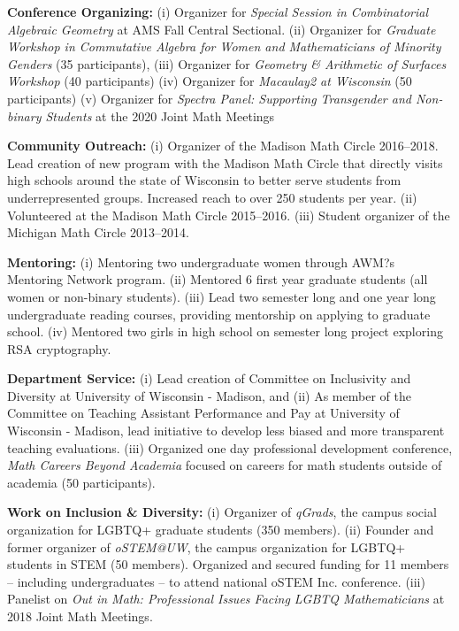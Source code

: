 \documentclass[11pt]{article}
\begin{document}
\begin{bibenum}[itemsep=4pt]

    \item \textbf{Conference Organizing:}
        (i) Organizer for \textit{Special Session in Combinatorial Algebraic Geometry} at AMS Fall Central Sectional. 
        (ii) Organizer for \textit{Graduate Workshop in Commutative Algebra for Women and Mathematicians of Minority Genders} (35 participants), 
        (iii) Organizer for \textit{Geometry \& Arithmetic of Surfaces Workshop} (40 participants)
        (iv) Organizer for \textit{Macaulay2 at Wisconsin} (50 participants)
        (v) Organizer for \textit{Spectra Panel: Supporting Transgender and Non-binary Students} at the 2020 Joint Math Meetings
    

    \item \textbf{Community Outreach:}
    	(i) Organizer of the Madison Math Circle 2016--2018. Lead creation of new program with the Madison Math Circle that directly visits high schools around the state of Wisconsin to better serve students from underrepresented groups. Increased reach to over 250 students per year.
	(ii)  Volunteered at the Madison Math Circle 2015--2016.
	(iii) Student organizer of the Michigan Math Circle 2013--2014.

    \item \textbf{Mentoring:}
        (i) Mentoring two undergraduate women through AWM?s Mentoring Network program.
        (ii) Mentored 6 first year graduate students (all women or non-binary students).
        (iii) Lead two semester long and one year long undergraduate reading courses, providing mentorship on applying to graduate school.
        (iv) Mentored two girls in high school on semester long project exploring RSA cryptography.
        
           
    \item \textbf{Department Service:} 
    (i) Lead creation of Committee on Inclusivity and Diversity at University of Wisconsin - Madison, and 
    (ii) As member of the Committee on Teaching Assistant Performance and Pay at University of Wisconsin - Madison, lead initiative to develop less biased and more transparent teaching evaluations. 
    (iii) Organized one day professional development conference, \textit{Math Careers Beyond Academia} focused on careers for math students outside of academia (50 participants). 

    \item \textbf{Work on Inclusion \& Diversity:}
    (i) Organizer of \textit{qGrads}, the campus social organization for LGBTQ+ graduate students (350 members).
    (ii) Founder and former organizer of \textit{oSTEM@UW}, the campus organization for LGBTQ+ students in STEM (50 members). Organized and secured funding for 11 members -- including undergraduates -- to attend national oSTEM Inc. conference. 
    (iii) Panelist on \textit{Out in Math: Professional Issues Facing LGBTQ Mathematicians} at 2018 Joint Math Meetings. 
      

\end{bibenum}
\end{document}
